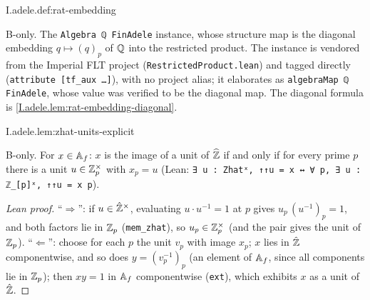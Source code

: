 \begin{definition}
\bonly
{}
\end{definition}
\begin{tfformal}{I.adele.def:rat-embedding}
\begin{tffidelity}
B-only. The \texttt{Algebra ℚ FinAdele} instance, whose structure map is the diagonal embedding $q\mapsto(q)_p$ of $\mathbb{Q}$ into the restricted product. The instance is vendored from the Imperial FLT project (\texttt{RestrictedProduct.lean}) and tagged directly (\texttt{attribute [tf\_aux …]}), with no project alias; it elaborates as \texttt{algebraMap ℚ FinAdele}, whose value was verified to be the diagonal map. The diagonal formula is \cref{I.adele.lem:rat-embedding-diagonal}.
\end{tffidelity}
\end{tfformal}

\begin{lemma}
\bonly
{}
\end{lemma}
\begin{tfformal}{I.adele.lem:zhat-units-explicit}
\begin{tffidelity}
B-only. For $x\in\mathbb{A}_f$: $x$ is the image of a unit of $\widehat{\mathbb{Z}}$ if and only if for every prime $p$ there is a unit $u\in\mathbb{Z}_p^\times$ with $x_p=u$ (Lean: \texttt{∃ u : Zhatˣ, ↑↑u = x ↔ ∀ p, ∃ u : ℤ\_[p]ˣ, ↑↑u = x p}).
\end{tffidelity}
\end{tfformal}
\begin{proof}[Lean proof]
``$\Rightarrow$'': if $u\in\hat{\mathbb{Z}}^\times$, evaluating $u\cdot u^{-1}=1$ at $p$ gives $u_p\,(u^{-1})_p=1$, and both factors lie in $\mathbb{Z}_p$ (\texttt{mem\_zhat}), so $u_p\in\mathbb{Z}_p^\times$ (and the pair gives the unit of $\mathbb{Z}_p$). ``$\Leftarrow$'': choose for each $p$ the unit $v_p$ with image $x_p$; $x$ lies in $\hat{\mathbb{Z}}$ componentwise, and so does $y=(v_p^{-1})_p$ (an element of $\mathbb{A}_f$, since all components lie in $\mathbb{Z}_p$); then $xy=1$ in $\mathbb{A}_f$ componentwise (\texttt{ext}), which exhibits $x$ as a unit of $\hat{\mathbb{Z}}$.
\end{proof}

